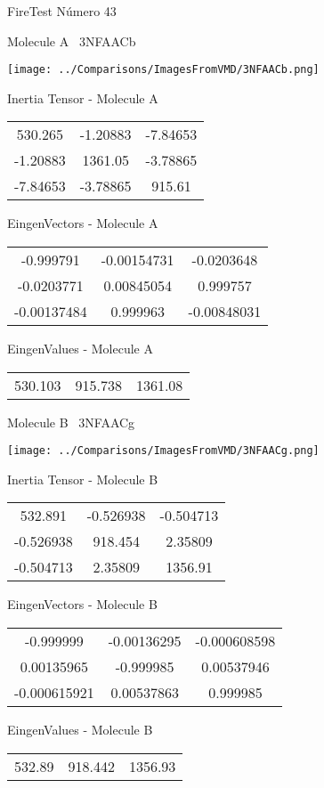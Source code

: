 \vtab[-3cm]
\begin{center}
{\large FireTest \tab Número 43}
\end{center}
\begin{multicols}{2}
\begin{center}

Molecule A \
3NFAACb

\texttt{[image: ../Comparisons/ImagesFromVMD/3NFAACb.png]}

Inertia Tensor - Molecule A \\
\begin{tabular}{|c c c|}
530.265	 & 	-1.20883	 & 	-7.84653	 \\
-1.20883	 & 	1361.05	 & 	-3.78865	 \\
-7.84653	 & 	-3.78865	 & 	915.61
\end{tabular}

\vtab
 EingenVectors - Molecule A     \\
\begin{tabular}{|c c c|}
-0.999791	 & 	-0.00154731	 & 	-0.0203648	 \\
-0.0203771	 & 	0.00845054	 & 	0.999757	 \\
-0.00137484	 & 	0.999963	 & 	-0.00848031
\end{tabular}

\vtab
 EingenValues - Molecule A     \\
\begin{tabular}{|c c c|}
530.103	 & 	915.738	 & 	1361.08	 \\
\end{tabular}
\columnbreak

Molecule B \
3NFAACg

\texttt{[image: ../Comparisons/ImagesFromVMD/3NFAACg.png]}

Inertia Tensor - Molecule B \\
\begin{tabular}{|c c c|}
532.891	 & 	-0.526938	 & 	-0.504713	 \\
-0.526938	 & 	918.454	 & 	2.35809	 \\
-0.504713	 & 	2.35809	 & 	1356.91
\end{tabular}

\vtab
 EingenVectors - Molecule B     \\
\begin{tabular}{|c c c|}
-0.999999	 & 	-0.00136295	 & 	-0.000608598	 \\
0.00135965	 & 	-0.999985	 & 	0.00537946	 \\
-0.000615921	 & 	0.00537863	 & 	0.999985
\end{tabular}

\vtab
 EingenValues - Molecule B     \\
\begin{tabular}{|c c c|}
532.89	 & 	918.442	 & 	1356.93	 \\
\end{tabular}

\end{center}
\end{multicols}

